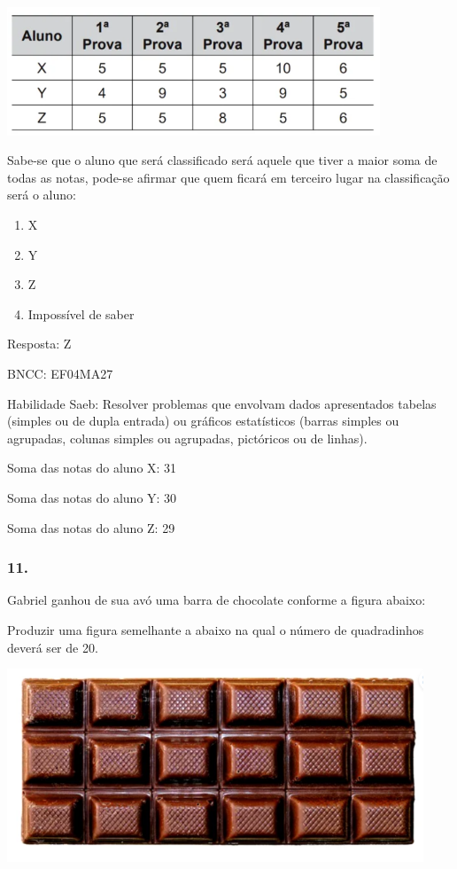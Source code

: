 \includegraphics[width=4.38462in,height=1.50708in]{media/image157.png}

Sabe-se que o aluno que será classificado será aquele que tiver a maior
soma de todas as notas, pode-se afirmar que quem ficará em terceiro
lugar na classificação será o aluno:

\begin{enumerate}
\def\labelenumi{\alph{enumi})}
\item
  X
\item
  Y
\item
  Z
\item
  Impossível de saber
\end{enumerate}

Resposta: Z

BNCC: EF04MA27

Habilidade Saeb: Resolver problemas que envolvam dados apresentados
tabelas (simples ou de dupla entrada) ou gráficos estatísticos (barras
simples ou agrupadas, colunas simples ou agrupadas, pictóricos ou de
linhas).

Soma das notas do aluno X: 31

Soma das notas do aluno Y: 30

Soma das notas do aluno Z: 29

\subsubsection{11.}\label{section-167}

Gabriel ganhou de sua avó uma barra de chocolate conforme a figura
abaixo:

Produzir uma figura semelhante a abaixo na qual o número de quadradinhos
deverá ser de 20.

\includegraphics[width=4.89209in,height=2.26686in]{media/image158.png}

